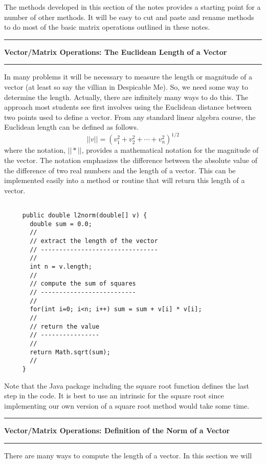 \documentclass[10pt,fleqn]{article}
\begin{document}
The methods developed in this section of the notes provides a starting point for
a number of other methods. It will be easy to cut and paste and rename methods
to do most of the basic matrix operations outlined in these notes.
\newpage
\vskip0.1in\hrule\vskip0.1in
\noindent
{\bf Vector/Matrix Operations: The Euclidean Length of a Vector}
\vskip0.1in\hrule\vskip0.1in
\noindent
In many problems it will be necessary to measure the length or magnitude of a
vector (at least so say the villian in Despicable Me). So, we need some way to
determine the length. Actually, there are infinitely many ways to do this. The
approach most students see first involves using the Euclidean distance between
two points used to define a vector. From any standard linear algebra course, the
Euclidean length can be defined as follows.
$$
  || v || = ( v_1^2 + v_2^2 + \cdots + v_n^2 )^{1/2}
$$
where the notation, $||*||$, provides a mathematical notation for the magnitude
of the vector. The notation emphasizes the difference between the absolute 
value of the difference of two real numbers and the length of a vector. This can
be implemented easily into a method or routine that will return this length of a
vector.
\begin{verbatim}

     public double l2norm(double[] v) {
       double sum = 0.0;
       //
       // extract the length of the vector
       // --------------------------------
       //
       int n = v.length;
       //
       // compute the sum of squares
       // --------------------------
       //
       for(int i=0; i<n; i++) sum = sum + v[i] * v[i];
       //
       // return the value
       // ----------------
       //
       return Math.sqrt(sum);
       //
     }

\end{verbatim}
Note that the Java package including the square root function defines the last
step in the code. It is best to use an intrinsic for the square root since
implementing our own version of a square root method would take some time.
\newpage
\vskip0.1in\hrule\vskip0.1in
\noindent
{\bf Vector/Matrix Operations: Definition of the Norm of a Vector}
\vskip0.1in\hrule\vskip0.1in
\noindent
There are many ways to compute the length of a vector. In this section we will
\end{document}
